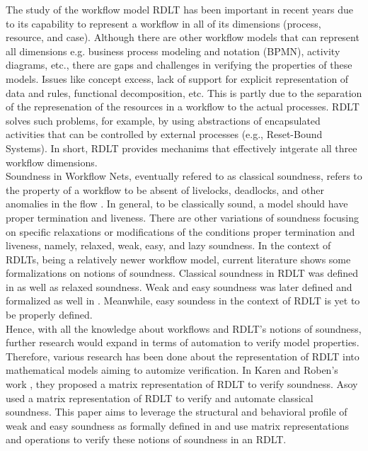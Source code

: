 The study of the workflow model RDLT has been important in recent years due to its capability to represent a workflow in all of its dimensions (process, resource, and case). Although there are other workflow models that can represent all dimensions e.g. business process modeling and notation (BPMN), activity diagrams, etc., there are gaps and challenges in verifying the properties of these models. Issues like concept excess, lack of support for explicit representation of data and rules, functional decomposition, etc. This is partly due to the separation of the represenation of the resources in a workflow to the actual processes. RDLT solves such problems, for example, by using abstractions of encapsulated activities that can be controlled by external processes (e.g., Reset-Bound Systems). In short, RDLT provides mechanims that effectively intgerate all three workflow dimensions. \cite{Malinao2017} \\

Soundness in Workflow Nets, eventually refered to as classical soundness, refers to the property of a workflow to be absent of livelocks, deadlocks, and other anomalies in the flow \cite{Aalst1996}. In general, to be classically sound, a model should have proper termination and liveness. There are other variations of soundness focusing on specific relaxations or modifications of the conditions proper termination and liveness, namely, relaxed, weak, easy, and lazy soundness. In the context of RDLTs, being a relatively newer workflow model, current literature shows some formalizations on notions of soundness. Classical soundness in RDLT was defined in \cite{MalinaoPJS2023} as well as relaxed soundness. Weak and easy soundness was later defined and formalized as well in \cite{Ramirez2024}. Meanwhile, easy soundess in the context of RDLT is yet to be properly defined. \\ 

Hence, with all the knowledge about workflows and RDLT's notions of soundness, further research would expand in terms of automation to verify model properties. Therefore, various research has been done about the representation of RDLT into mathematical models aiming to automize verification. In Karen and Roben's work \cite{KarenRoben2018}, they proposed a matrix representation of RDLT to verify soundness. Asoy \cite{Asoy2024} used a matrix representation of RDLT to verify and automate classical soundness. This paper aims to leverage the structural and behavioral profile of weak and easy soundness as formally defined in \cite{Ramirez2024} and use matrix representations and operations to verify these notions of soundness in an RDLT. \\

